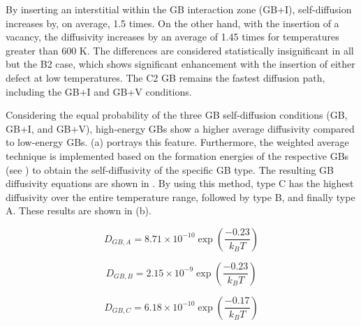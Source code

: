 \documentclass[review]{elsarticle}
\begin{document}
By inserting an interstitial within the GB interaction zone (GB+I), self-diffusion increases by, on average, 1.5 times. On the other hand, with the insertion of a vacancy, the diffusivity increases by an average of 1.45 times for temperatures greater than 600 K. The differences are considered statistically insignificant in all but the B2 case, which shows significant enhancement with the insertion of either defect at low temperatures. The C2 GB remains the fastest diffusion path, including the GB+I and GB+V conditions. 

Considering the equal probability of the three GB self-diffusion conditions (GB, GB+I, and GB+V), high-energy GBs show a higher average diffusivity compared to low-energy GBs.  (a) portrays this feature. Furthermore, the weighted average technique is implemented based on the formation energies of the respective GBs (see ) to obtain the self-diffusivity of the specific GB type. The resulting GB diffusivity equations are shown in . By using this method, type C has the highest diffusivity over the entire temperature range, followed by type B, and finally type A. These results are shown in  (b). %

\begin{equation}
\label{eq:type}
D_{GB,A} = 8.71 \times 10^{-10} \exp\left(\frac{-0.23}{k_{B} T}\right)
\end{equation}

\begin{equation}
\label{eq:type1}
D_{GB,B} = 2.15 \times 10^{-9} \exp\left(\frac{-0.23}{k_{B} T}\right)
\end{equation}

\begin{equation}
\label{eq:type2}
D_{GB,C} = 6.18 \times 10^{-10} \exp\left(\frac{-0.17}{k_{B} T}\right)
\end{equation}
\end{document}

